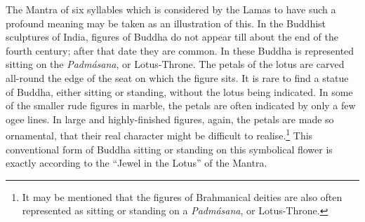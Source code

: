 \documentclass[a4paper, 11pt, oneside, polutonikogreek, english]{article}
\begin{document}
The Mantra of six syllables which is considered by the Lamas to have such a profound meaning may be taken as an illustration of this. In the Buddhist sculptures of India, figures of Buddha do not appear till about the end of the fourth century; after that date they are common. In these Buddha is represented sitting on the \emph{Padmásana}, or Lotus-Throne. The petals of the lotus are carved all-round the edge of the seat on which the figure sits. It is rare to find a statue of Buddha, either sitting or standing, without the lotus being indicated. In some of the smaller rude figures in marble, the petals are often indicated by only a few ogee lines. In large and highly-finished figures, again, the petals are made so ornamental, that their real character might be difficult to realise.\footnote{It may be mentioned that the figures of Brahmanical deities are also often represented as sitting or standing on a \emph{Padmásana}, or Lotus-Throne.} This conventional form of Buddha sitting or standing on this symbolical flower is exactly according to the ``Jewel in the Lotus'' of the Mantra.
\end{document}
